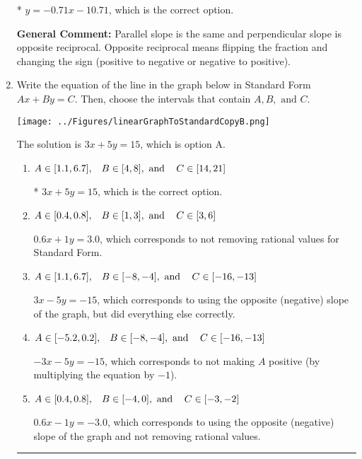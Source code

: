 \documentclass{extbook}[14pt]
\newcommand{\litem}[1]{\item #1

\rule{\textwidth}{0.4pt}}
\begin{document}
\begin{enumerate}
{\begin{enumerate}[label=\Alph*.]
* $y = -0.71x - 10.71$, which is the correct option.
\end{enumerate}

\textbf{General Comment:} Parallel slope is the same and perpendicular slope is opposite reciprocal. Opposite reciprocal means flipping the fraction and changing the sign (positive to negative or negative to positive).
}
\litem{
Write the equation of the line in the graph below in Standard Form $Ax+By=C$. Then, choose the intervals that contain $A, B, \text{ and } C$.

\begin{center}
    \texttt{[image: ../Figures/linearGraphToStandardCopyB.png]}
\end{center}


The solution is \( 3x + 5y = 15 \), which is option A.\begin{enumerate}[label=\Alph*.]
\item \( A \in [1.1, 6.7], \hspace{3mm} B \in [4, 8], \text{ and } \hspace{3mm} C \in [14, 21] \)

* $3x + 5y = 15$, which is the correct option.
\item \( A \in [0.4, 0.8], \hspace{3mm} B \in [1, 3], \text{ and } \hspace{3mm} C \in [3, 6] \)

 $0.6x + 1y = 3.0$, which corresponds to not removing rational values for Standard Form.
\item \( A \in [1.1, 6.7], \hspace{3mm} B \in [-8, -4], \text{ and } \hspace{3mm} C \in [-16, -13] \)

 $3x - 5y = -15$, which corresponds to using the opposite (negative) slope of the graph, but did everything else correctly.
\item \( A \in [-5.2, 0.2], \hspace{3mm} B \in [-8, -4], \text{ and } \hspace{3mm} C \in [-16, -13] \)

 $-3x - 5y = -15$, which corresponds to not making $A$ positive (by multiplying the equation by $-1$).
\item \( A \in [0.4, 0.8], \hspace{3mm} B \in [-4, 0], \text{ and } \hspace{3mm} C \in [-3, -2] \)

 $0.6x - 1y = -3.0$, which corresponds to using the opposite (negative) slope of the graph and not removing rational values.
\end{enumerate}

}
\end{enumerate}
\end{document}
